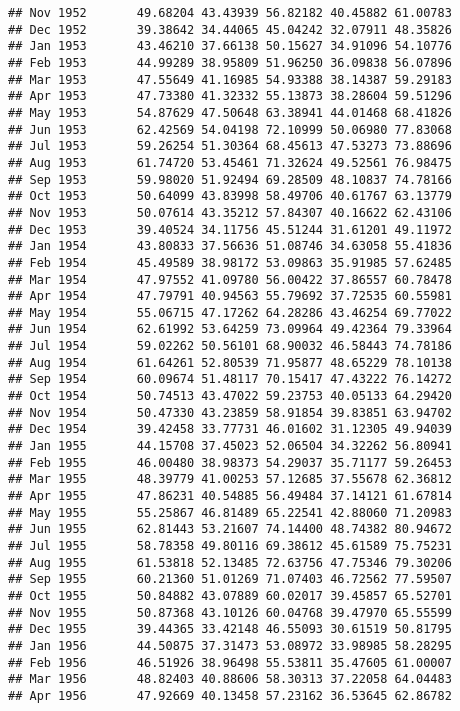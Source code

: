 \documentclass[
]{article}
\begin{document}
\begin{verbatim}
## Nov 1952       49.68204 43.43939 56.82182 40.45882 61.00783
## Dec 1952       39.38642 34.44065 45.04242 32.07911 48.35826
## Jan 1953       43.46210 37.66138 50.15627 34.91096 54.10776
## Feb 1953       44.99289 38.95809 51.96250 36.09838 56.07896
## Mar 1953       47.55649 41.16985 54.93388 38.14387 59.29183
## Apr 1953       47.73380 41.32332 55.13873 38.28604 59.51296
## May 1953       54.87629 47.50648 63.38941 44.01468 68.41826
## Jun 1953       62.42569 54.04198 72.10999 50.06980 77.83068
## Jul 1953       59.26254 51.30364 68.45613 47.53273 73.88696
## Aug 1953       61.74720 53.45461 71.32624 49.52561 76.98475
## Sep 1953       59.98020 51.92494 69.28509 48.10837 74.78166
## Oct 1953       50.64099 43.83998 58.49706 40.61767 63.13779
## Nov 1953       50.07614 43.35212 57.84307 40.16622 62.43106
## Dec 1953       39.40524 34.11756 45.51244 31.61201 49.11972
## Jan 1954       43.80833 37.56636 51.08746 34.63058 55.41836
## Feb 1954       45.49589 38.98172 53.09863 35.91985 57.62485
## Mar 1954       47.97552 41.09780 56.00422 37.86557 60.78478
## Apr 1954       47.79791 40.94563 55.79692 37.72535 60.55981
## May 1954       55.06715 47.17262 64.28286 43.46254 69.77022
## Jun 1954       62.61992 53.64259 73.09964 49.42364 79.33964
## Jul 1954       59.02262 50.56101 68.90032 46.58443 74.78186
## Aug 1954       61.64261 52.80539 71.95877 48.65229 78.10138
## Sep 1954       60.09674 51.48117 70.15417 47.43222 76.14272
## Oct 1954       50.74513 43.47022 59.23753 40.05133 64.29420
## Nov 1954       50.47330 43.23859 58.91854 39.83851 63.94702
## Dec 1954       39.42458 33.77731 46.01602 31.12305 49.94039
## Jan 1955       44.15708 37.45023 52.06504 34.32262 56.80941
## Feb 1955       46.00480 38.98373 54.29037 35.71177 59.26453
## Mar 1955       48.39779 41.00253 57.12685 37.55678 62.36812
## Apr 1955       47.86231 40.54885 56.49484 37.14121 61.67814
## May 1955       55.25867 46.81489 65.22541 42.88060 71.20983
## Jun 1955       62.81443 53.21607 74.14400 48.74382 80.94672
## Jul 1955       58.78358 49.80116 69.38612 45.61589 75.75231
## Aug 1955       61.53818 52.13485 72.63756 47.75346 79.30206
## Sep 1955       60.21360 51.01269 71.07403 46.72562 77.59507
## Oct 1955       50.84882 43.07889 60.02017 39.45857 65.52701
## Nov 1955       50.87368 43.10126 60.04768 39.47970 65.55599
## Dec 1955       39.44365 33.42148 46.55093 30.61519 50.81795
## Jan 1956       44.50875 37.31473 53.08972 33.98985 58.28295
## Feb 1956       46.51926 38.96498 55.53811 35.47605 61.00007
## Mar 1956       48.82403 40.88606 58.30313 37.22058 64.04483
## Apr 1956       47.92669 40.13458 57.23162 36.53645 62.86782

\end{verbatim}
\end{document}

